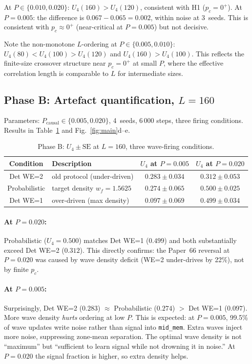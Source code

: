 \documentclass[11pt,a4paper]{article}
\begin{document}
At $P\in\{0.010,0.020\}$: $U_4(160)>U_4(120)$, consistent with H1 ($p_c=0^+$).
At $P=0.005$: the difference is $0.067-0.065=0.002$, within noise at 3~seeds.
This is consistent with $p_c\approx 0^+$ (near-critical at $P=0.005$) but
not decisive.

Note the non-monotone $L$-ordering at $P\in\{0.005,0.010\}$:
$U_4(80)<U_4(100)>U_4(120)$ and $U_4(160)>U_4(100)$.
This reflects the finite-size crossover structure near $p_c=0^+$ at small $P$,
where the effective correlation length is comparable to $L$ for intermediate sizes.

\subsection{Phase B: Artefact quantification, $L=160$}

Parameters: $P_\text{causal}\in\{0.005,0.020\}$, 4~seeds, $6\,000$ steps,
three firing conditions.
Results in Table~\ref{tab:phaseB} and Fig.~\ref{fig:main}d--e.

\begin{table}[h]
\centering
\caption{Phase B: $U_4\pm\mathrm{SE}$ at $L=160$, three wave-firing conditions.}
\label{tab:phaseB}
\begin{tabular}{clcc}
\toprule
Condition & Description & $U_4$ at $P=0.005$ & $U_4$ at $P=0.020$ \\
\midrule
Det WE=2 & old protocol (under-driven) & $0.283\pm0.034$ & $0.312\pm0.053$ \\
Probabilistic & target density $w_f=1.5625$ & $0.274\pm0.065$ & $0.500\pm0.025$ \\
Det WE=1  & over-driven (max density) & $0.097\pm0.069$ & $0.499\pm0.034$ \\
\bottomrule
\end{tabular}
\end{table}

\paragraph{At $P=0.020$:} Probabilistic ($U_4=0.500$) matches Det WE=1 ($0.499$)
and both substantially exceed Det WE=2 ($0.312$).  This directly confirms:
the Paper~66 reversal at $P=0.020$ was caused by wave density deficit
(WE=2 under-drives by 22\%), not by finite $p_c$.

\paragraph{At $P=0.005$:} Surprisingly, Det WE=2 ($0.283$) $\approx$ Probabilistic
($0.274$) $>$ Det WE=1 ($0.097$).  More wave density \emph{hurts} ordering at
low $P$.  This is expected: at $P=0.005$, 99.5\% of wave updates write
noise rather than signal into \texttt{mid\_mem}.  Extra waves inject more noise,
suppressing zone-mean separation.  The optimal wave density is not ``maximum''
but ``sufficient to learn signal while not drowning it in noise.''
At $P=0.020$ the signal fraction is higher, so extra density helps.
\end{document}
